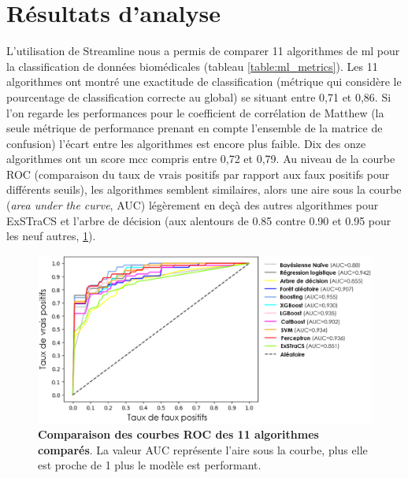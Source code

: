 \section{Résultats d'analyse}
L'utilisation de Streamline nous a permis de comparer 11 algorithmes de \gls{ml} pour la classification de données biomédicales (tableau \ref{table:ml_metrics}). Les 11 algorithmes ont montré une exactitude de classification (métrique qui considère le pourcentage de classification correcte au global) se situant entre 0,71 et 0,86. Si l’on regarde les performances pour le coefficient de corrélation de Matthew (la seule métrique de performance prenant en compte l'ensemble de la matrice de confusion) l'écart entre les algorithmes est encore plus faible. Dix des onze algorithmes ont un score \gls{mcc} compris entre 0,72 et 0,79. Au niveau de la courbe ROC (comparaison du taux de vrais positifs par rapport aux faux positifs pour différents seuils), les algorithmes semblent similaires, alors une aire sous la courbe (\textit{area under the curve}, AUC) légèrement en deçà des autres algorithmes pour ExSTraCS et l'arbre de décision (aux alentours de 0.85 contre 0.90 et 0.95 pour les neuf autres, \ref{fig:roc_curve}).
\begin{figure}[!htbp]
  \centering
  \includegraphics[width=1\textwidth]{figures/roc_streamline.png}
  \caption[Comparaison des courbes ROC]{\textbf{Comparaison des courbes ROC des 11 algorithmes comparés}. La valeur AUC représente l'aire sous la courbe, plus elle est proche de 1 plus le modèle est performant.}
  \label{fig:roc_curve}
\end{figure}
